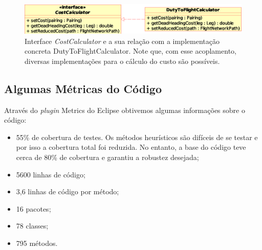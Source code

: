\begin{figure}[htbp]
	\begin{center}
		\includegraphics[scale=0.65]{fig/cost_calculator.eps}
		\caption{Interface {\it CostCalculator} e a sua relação com a implementação concreta
    DutyToFlightCalculator. Note que, com esse acoplamento, diversas implementações para o cálculo
    do custo são possíveis.}
		\label{fig:cost_interface}
	\end{center}
\end{figure}



\subsection{Algumas Métricas do Código}
\label{sec:metricas}

Através do {\it plugin} Metrics do Eclipse obtivemos algumas informações sobre o código: 

\begin{itemize}
\item 55\% de cobertura de testes. Os métodos heurísticos são difíceis de se testar e por isso a
cobertura total foi reduzida. No entanto, a base do código teve cerca de 80\% de cobertura e 
garantiu a robustez desejada;
\item 5600 linhas de código; 
\item 3,6 linhas de código por método; 
\item 16 pacotes; 
\item 78 classes; 
\item 795 métodos.
\end{itemize}


